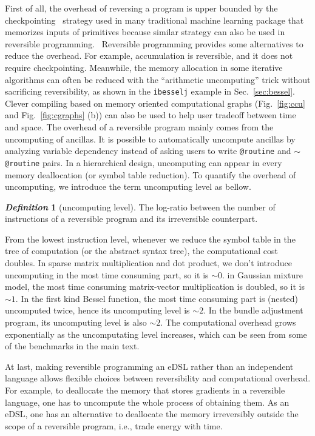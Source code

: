\documentclass{article}
\newcommand{\<}{\langle}
\renewcommand{\>}{\rangle}
\newcommand{\Fig}[1]{Fig.~\ref{#1}}
\newcommand{\Sec}[1]{Sec.~\ref{#1}}
\theoremstyle{definition}\newtheorem{definition}{\textit{Definition}}
\begin{document}
First of all, the overhead of reversing a program is upper bounded by the checkpointing~\cite{Chen2016} strategy used in many traditional machine learning package that memorizes inputs of primitives because similar strategy can also be used in reversible programming.~\cite{Perumalla2013}
Reversible programming provides some alternatives to reduce the overhead.
For example, accumulation is reversible, and it does not require checkpointing.
Meanwhile, the memory allocation in some iterative algorithms can often be reduced with the ``arithmetic uncomputing'' trick without sacrificing reversibility, as shown in the \texttt{ibesselj} example in \Sec{sec:bessel}.
Clever compiling based on memory oriented computational graphs (\Fig{fig:ccu} and \Fig{fig:cgraphs} (b)) can also be used to help user tradeoff between time and space.
The overhead of a reversible program mainly comes from the uncomputing of ancillas.
It is possible to automatically uncompute ancillas by analyzing variable dependency instead of asking users to write \texttt{@routine} and \texttt{$\sim$@routine} pairs.
In a hierarchical design, uncomputing can appear in every memory deallocation (or symbol table reduction). To quantify the overhead of uncomputing, we introduce the term uncomputing level as bellow.
\begin{definition}[uncomputing level]
    The log-ratio between the number of instructions of a reversible program and its irreversible counterpart.
\end{definition}
From the lowest instruction level, whenever we reduce the symbol table in the tree of computation (or the abstract syntax tree), the computational cost doubles.
In sparse matrix multiplication and dot product, we don't introduce uncomputing in the most time consuming part, so it is $\sim0$.
in Gaussian mixture model, the most time consuming matrix-vector multiplication is doubled, so it is $\sim 1$.
In the first kind Bessel function, the most time consuming part is (nested) uncomputed twice, hence its uncomputing level is $\sim2$.
In the bundle adjustment program, its uncomputing level is also $\sim2$.
The computational overhead grows exponentially as the uncomputating level increases, which can be seen from some of the benchmarks in the main text.

At last, making reversible programming an eDSL rather than an independent language allows flexible choices between reversibility and computational overhead. For example, to deallocate the memory that stores gradients in a reversible language, one has to uncompute the whole process of obtaining them.
As an eDSL, one has an alternative to deallocate the memory irreversibly outside the scope of a reversible program, i.e., trade energy with time.
\end{document}
